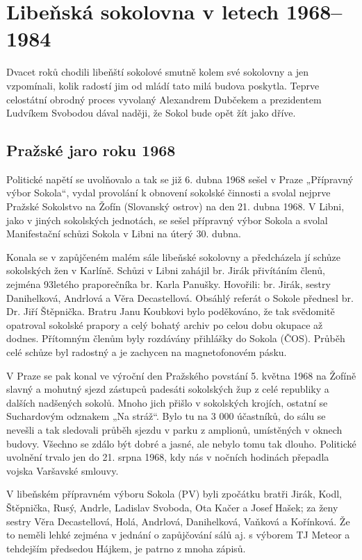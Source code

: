 \section{Libeňská sokolovna v letech
1968--1984}\label{libeux148skuxe1-sokolovna-v-letech-19681984}

Dvacet roků chodili libeňští sokolové smutně kolem své sokolovny a jen
vzpomínali, kolik radostí jim od mládí tato milá budova poskytla. Teprve
celostátní obrodný proces vyvolaný Alexandrem Dubčekem a prezidentem
Ludvíkem Svobodou dával naději, že Sokol bude opět žít jako dříve.

\subsection{Pražské jaro roku 1968}\label{praux17eskuxe9-jaro-roku-1968}

Politické napětí se uvolňovalo a tak se již 6. dubna 1968 sešel v Praze
„Přípravný výbor Sokola``, vydal provolání k obnovení sokolské činnosti
a svolal nejprve Pražské Sokolstvo na Žofín (Slovanský ostrov) na den
21. dubna 1968. V Libni, jako v jiných sokolských jednotách, se sešel
přípravný výbor Sokola a svolal Manifestační schůzi Sokola v Libni na
úterý 30. dubna.

Konala se v zapůjčeném malém sále libeňské sokolovny a předcházela jí
schůze sokolských žen v Karlíně. Schůzi v Libni zahájil br. Jirák
přivítáním členů, zejména 93letého praporečníka br. Karla Panušky.
Hovořili: br. Jirák, sestry Danihelková, Andrlová a Věra Decastellová.
Obsáhlý referát o Sokole přednesl br. Dr. Jiří Štěpnička. Bratru Janu
Koubkovi bylo poděkováno, že tak svědomitě opatroval sokolské prapory a
celý bohatý archiv po celou dobu okupace až dodnes. Přítomným členům
byly rozdávány přihlášky do Sokola (ČOS). Průběh celé schůze byl
radostný a je zachycen na magnetofonovém pásku.

V Praze se pak konal ve výroční den Pražského povstání 5. května 1968 na
Žofíně slavný a mohutný sjezd zástupců padesáti sokolských žup z celé
republiky a dalších nadšených sokolů. Mnoho jich přišlo v sokolských
krojích, ostatní se Suchardovým odznakem „Na stráž``. Bylo tu na 3 000
účastníků, do sálu se nevešli a tak sledovali průběh sjezdu v parku z
amplionů, umístěných v oknech budovy. Všechno se zdálo být dobré a
jasné, ale nebylo tomu tak dlouho. Politické uvolnění trvalo jen do 21.
srpna 1968, kdy nás v nočních hodinách přepadla vojska Varšavské
smlouvy.

V libeňském přípravném výboru Sokola (PV) byli zpočátku bratři Jirák,
Kodl, Štěpnička, Rusý, Andrle, Ladislav Svoboda, Ota Kačer a Josef
Hašek; za ženy sestry Věra Decastellová, Holá, Andrlová, Danihelková,
Vaňková a Kořínková. Že to neměli lehké zejména v jednání o zapůjčování
sálů aj. s výborem TJ Meteor a tehdejším předsedou Hájkem, je patrno z
mnoha zápisů.

